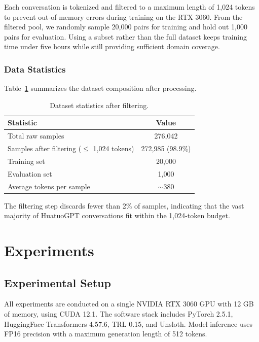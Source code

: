 \documentclass[11pt,a4paper]{article}
\begin{document}
Each conversation is tokenized and filtered to a maximum length of 1,024 tokens to prevent out-of-memory errors during training on the RTX 3060. From the filtered pool, we randomly sample 20,000 pairs for training and hold out 1,000 pairs for evaluation. Using a subset rather than the full dataset keeps training time under five hours while still providing sufficient domain coverage.

\subsubsection{Data Statistics}

Table~\ref{tab:data_stats} summarizes the dataset composition after processing.

\begin{table}[ht]
\centering
\caption{Dataset statistics after filtering.}
\label{tab:data_stats}
\begin{tabular}{lc}
\toprule
\textbf{Statistic} & \textbf{Value} \\
\midrule
Total raw samples & 276,042 \\
Samples after filtering ($\leq$ 1,024 tokens) & 272,985 (98.9\%) \\
Training set & 20,000 \\
Evaluation set & 1,000 \\
Average tokens per sample & $\sim$380 \\
\bottomrule
\end{tabular}
\end{table}

The filtering step discards fewer than 2\% of samples, indicating that the vast majority of HuatuoGPT conversations fit within the 1,024-token budget.

\section{Experiments}
\label{sec:experiments}

\subsection{Experimental Setup}

All experiments are conducted on a single NVIDIA RTX 3060 GPU with 12 GB of memory, using CUDA 12.1. The software stack includes PyTorch 2.5.1, HuggingFace Transformers 4.57.6, TRL 0.15, and Unsloth. Model inference uses FP16 precision with a maximum generation length of 512 tokens.
\end{document}
